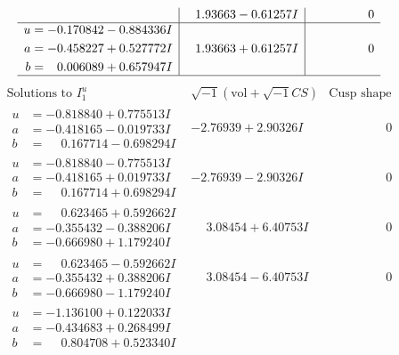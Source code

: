 \documentclass[1p]{elsarticle_modified}
\theoremstyle{definition}
\newcommand{\I}{\sqrt{-1}}
\begin{document}
$$\begin{array}{c|c|c}
 & \phantom{-}1.93663 - 0.61257 I & \phantom{-0.000000 } 0 \\ \hline\begin{aligned}
u &= -0.170842 - 0.884336 I \\
a &= -0.458227 + 0.527772 I \\
b &= \phantom{-}0.006089 + 0.657947 I\end{aligned}
 & \phantom{-}1.93663 + 0.61257 I & \phantom{-0.000000 } 0\\
 \hline 
 \end{array}$$\newpage$$\begin{array}{c|c|c}  
\text{Solutions to }I^u_{1}& \I (\text{vol} + \sqrt{-1}CS) & \text{Cusp shape}\\
 \hline 
\begin{aligned}
u &= -0.818840 + 0.775513 I \\
a &= -0.418165 - 0.019733 I \\
b &= \phantom{-}0.167714 - 0.698294 I\end{aligned}
 & -2.76939 + 2.90326 I & \phantom{-0.000000 } 0 \\ \hline\begin{aligned}
u &= -0.818840 - 0.775513 I \\
a &= -0.418165 + 0.019733 I \\
b &= \phantom{-}0.167714 + 0.698294 I\end{aligned}
 & -2.76939 - 2.90326 I & \phantom{-0.000000 } 0 \\ \hline\begin{aligned}
u &= \phantom{-}0.623465 + 0.592662 I \\
a &= -0.355432 - 0.388206 I \\
b &= -0.666980 + 1.179240 I\end{aligned}
 & \phantom{-}3.08454 + 6.40753 I & \phantom{-0.000000 } 0 \\ \hline\begin{aligned}
u &= \phantom{-}0.623465 - 0.592662 I \\
a &= -0.355432 + 0.388206 I \\
b &= -0.666980 - 1.179240 I\end{aligned}
 & \phantom{-}3.08454 - 6.40753 I & \phantom{-0.000000 } 0 \\ \hline\begin{aligned}
u &= -1.136100 + 0.122033 I \\
a &= -0.434683 + 0.268499 I \\
b &= \phantom{-}0.804708 + 0.523340 I\end{aligned}

\end{array}$$
\end{document}
